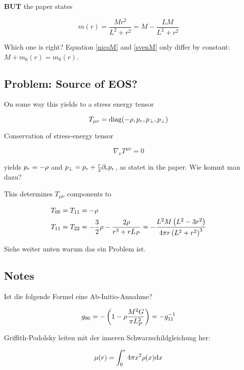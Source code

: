 \documentclass[12pt,a4paper]{article}
\begin{document}
{\bf BUT} the paper states

\begin{equation}
m(r) = \frac{M r^2}{L^2 + r^2} = M - \frac{LM}{L^2 + r^2} \label{nicoM}
\end{equation}

Which one is right? Equation \ref{nicoM} and \ref{svenM} only differ by constant: $M + m_6(r) = m_8(r)$.

\subsection{Problem: Source of EOS?}

On some way this yields to a stress energy tensor

\begin{equation}
T_{\mu \nu} = \text{diag}(-\rho, p_r, p_\perp, p_\perp)
\end{equation}

Conservation of stress-energy tensor

\begin{equation}
\nabla_\nu T^{\mu \nu} = 0
\end{equation}

yields $p_r = -\rho$ and $p_\perp = p_r + \frac{r}{2} \partial_r p_r$, as statet in the paper. Wie kommt man dazu?


This determines $T_{\mu \nu}$ components to

\begin{align}
T_{00} = T_{11} &= -\rho \\
T_{11} = T_{22} &= -\frac{3}{2} \rho - \frac{2\rho}{r^3 + rL_P} 
= -\frac{L^2 M \left(L^2-3 r^2\right)}{4 \pi  r \left(L^2+r^2\right)^3} \label{nico-p3p4}
\end{align}

Siehe weiter unten warum das ein Problem ist.

\subsection{Notes}

Ist die folgende Formel eine Ab-Initio-Annahme?

\begin{equation}
g_{00} = -\left( 1 - \rho \frac{M^2 G}{\pi L_P^2}\right) = -g_{11}^{-1}
\end{equation}

Griffith-Podolsky leiten mit der inneren Schwarzschildgleichung her:

\begin{equation}
\mu(r) = \int_0^r 4\pi x^2 \rho(x) \mathrm{d} x
\end{equation}
\end{document}
